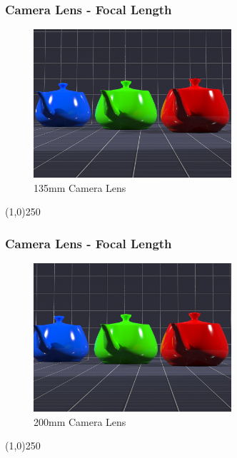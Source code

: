 \begin{frame}
\frametitle{Camera Lens - Focal Length}
\begin{figure}
	\centering
	\includegraphics[height=5.5cm]{img/Cameras/135mm.jpg}
	\caption[135mm Camera Lens]{135mm Camera Lens}
	\label{fig:135mm}
\end{figure}
\end{frame}
\begin{center}\line(1,0){250}\end{center}


\begin{frame}
\frametitle{Camera Lens - Focal Length}
\begin{figure}
	\centering
	\includegraphics[height=5.5cm]{img/Cameras/200mm.jpg}
	\caption[200mm Camera Lens]{200mm Camera Lens}
	\label{fig:200mm}
\end{figure}
\end{frame}
\begin{center}\line(1,0){250}\end{center}



